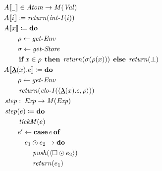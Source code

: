 \begin{figure}

\small\begin{align*}
&\hspace{0em} A \llbracket  \underline{\hspace{0.5em}}  \rrbracket   \in   \itop{Atom}   \rightarrow   \itop{M}(  \itop{Val})  \\
&\hspace{0em} A \llbracket i \rrbracket   \coloneqq   \itop{return}  (\itop{int-I}( i)) \\
&\hspace{0em} A \llbracket x \rrbracket   \coloneqq   \ttbfop{do}  \\
&\hspace{2em}  \rho   \leftarrow   \itop{get-Env}  \\
&\hspace{2em}  \sigma   \leftarrow   \itop{get-Store}  \\
&\hspace{2em}  \ttbfop{if}  x  \in   \rho   \;\ttbfop{then}\;   \itop{return}(  \sigma ( \rho (x)))  \;\ttbfop{\litelse}\;   \itop{return}(  \bot ) \\
&\hspace{0em} A \llbracket  \keyword{\lambda} (x).e \rrbracket   \coloneqq   \ttbfop{do}  \\
&\hspace{2em}  \rho   \leftarrow   \itop{get-Env}  \\
&\hspace{2em}  \itop{return}  (\itop{clo-I}(  \langle  \keyword{\lambda} (x).e, \rho  \rangle )) \\
&\hspace{0em}  \itop{step}   \mathbin{\colon}   \itop{Exp}   \rightarrow   \itop{M}  (\itop{Exp})  \\
&\hspace{0em}  \itop{step}( e)  \coloneqq   \ttbfop{do}  \\
&\hspace{2em}  \itop{tickM}( e) \\
&\hspace{2em} e'  \leftarrow   \ttbfop{case}  e  \ttbfop{of}  \\
&\hspace{3em} e _1   \odot  e _2   \rightarrow   \ttbfop{do}  \\
&\hspace{4em}  \itop{push}(  \langle  \square   \odot  e _2  \rangle ) \\
&\hspace{4em}  \itop{return}( e _1 ) \\

\end{align*}
\end{figure}
